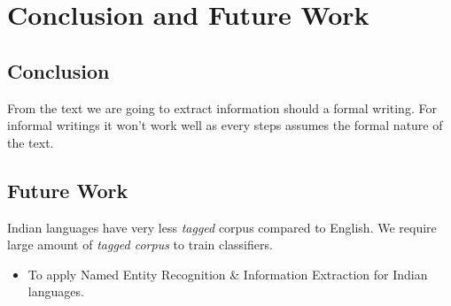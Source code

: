 \documentclass[12pt]{report}
\begin{document}
\chapter{Conclusion and Future Work}
\section{Conclusion}
\par From the text we are going to extract information should a formal writing. For informal
 writings it won't work well as every steps assumes the formal nature of the text.

\section{Future Work}
\par Indian languages have very less \textit{tagged} corpus compared to English. We require
large amount of \textit{tagged corpus} to train classifiers.
\begin{itemize}
\item To apply Named Entity Recognition \& Information Extraction for Indian languages.
\end{itemize}
\end{document}
